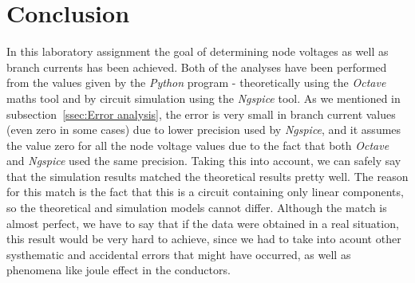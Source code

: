 \section{Conclusion}
\label{sec:conclusion}

\par In this laboratory assignment the goal of determining node voltages as well as branch currents has been achieved. Both of the analyses have been performed from the values given by the \emph{Python} program - theoretically using the \emph{Octave} maths tool and by circuit simulation using the \emph{Ngspice} tool. As we mentioned in subsection~\ref{ssec:Error analysis}, the error is very small in branch current values (even zero in some cases) due to lower precision used by \emph{Ngspice}, and it assumes the value zero for all the node voltage values due to the fact that both \emph{Octave} and \emph{Ngspice} used the same precision. Taking this into account, we can safely say that the simulation results matched the theoretical results pretty well. The reason for this match is the fact that this is a circuit containing only linear components, so the theoretical and simulation models cannot differ. Although the match is almost perfect, we have to say that if the data were obtained in a real situation, this result would be very hard to achieve, since we had to take into acount other systhematic and accidental errors that might have occurred, as well as phenomena like joule effect in the conductors.  

